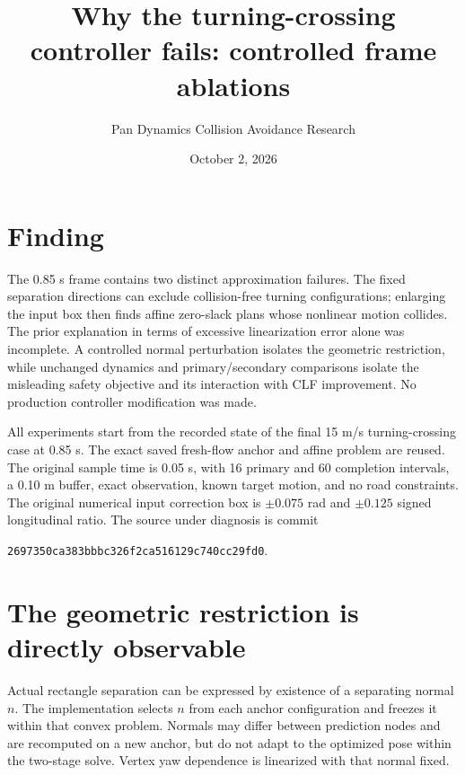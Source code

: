 \documentclass[11pt]{article}
\title{Why the turning-crossing controller fails: controlled frame ablations}
\author{Pan Dynamics Collision Avoidance Research}
\date{October 2, 2026}
\begin{document}
\maketitle
\section{Finding}
The 0.85 s frame contains two distinct approximation failures. The fixed
separation directions can exclude collision-free turning configurations;
enlarging the input box then finds affine zero-slack plans whose nonlinear
motion collides. The prior explanation in terms of excessive linearization
error alone was incomplete. A controlled normal perturbation isolates the
geometric restriction, while unchanged dynamics and primary/secondary
comparisons isolate the misleading safety objective and its interaction with
CLF improvement. No production controller modification was made.

All experiments start from the recorded state of the final 15 m/s
turning-crossing case at 0.85 s. The exact saved fresh-flow anchor and affine
problem are reused. The original sample time is 0.05 s, with 16 primary and
60 completion intervals, a 0.10 m buffer, exact observation, known target
motion, and no road constraints. The original numerical input correction
box is $\pm0.075$ rad and $\pm0.125$ signed longitudinal ratio. The source
under diagnosis is commit
\begin{center}\small\texttt{2697350ca383bbbc326f2ca516129c740cc29fd0}.\end{center}

\section{The geometric restriction is directly observable}
Actual rectangle separation can be expressed by existence of a separating
normal $n$. The implementation selects $n$ from each anchor configuration
and freezes it within that convex problem. Normals may differ between
prediction nodes and are recomputed on a new anchor, but do not adapt to the
optimized pose within the two-stage solve. Vertex yaw dependence is
linearized with that normal fixed.
\end{document}
